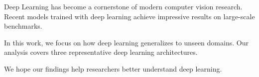 Deep Learning has become a cornerstone of modern computer vision research. Recent models trained with deep learning achieve impressive results on large-scale benchmarks.

In this work, we focus on how deep learning generalizes to unseen domains. Our analysis covers three representative deep learning architectures.

We hope our findings help researchers better understand deep learning.
